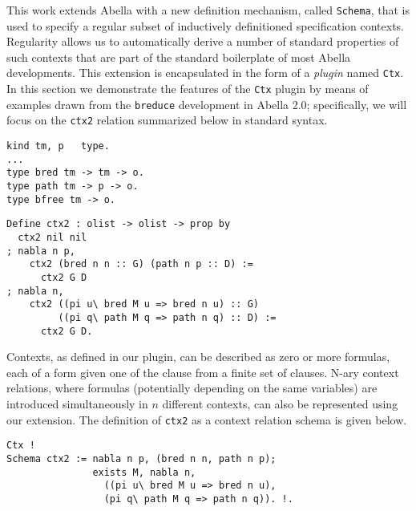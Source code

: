 \documentclass[nocopyrightspace,authoryear]{sigplanconf}
\begin{document}
This work extends Abella with a new definition mechanism, called \lstinline{Schema}, that is used to specify a regular subset of inductively definitioned specification contexts. Regularity allows us to automatically derive a number of standard properties of such contexts that are part of the standard boilerplate of most Abella developments.
%
This extension is encapsulated in the form of a \emph{plugin} named \lstinline{Ctx}.
%
In this section we demonstrate the features of the \lstinline{Ctx} plugin by means of examples drawn from the \lstinline{breduce} development in Abella 2.0; specifically, we will focus on the \lstinline{ctx2} relation summarized below in standard syntax.

\begin{lstlisting}
kind tm, p   type.
...
type bred tm -> tm -> o.
type path tm -> p -> o.
type bfree tm -> o.
\end{lstlisting}
\begin{lstlisting}
Define ctx2 : olist -> olist -> prop by
  ctx2 nil nil
; nabla n p,
    ctx2 (bred n n :: G) (path n p :: D) := 
      ctx2 G D
; nabla n,
    ctx2 ((pi u\ bred M u => bred n u) :: G)
         ((pi q\ path M q => path n q) :: D) :=
      ctx2 G D.
\end{lstlisting}

Contexts, as defined in our plugin, can be described as zero or more formulas, each of a form given one of the clause from a finite set of clauses. N-ary context relations, where formulas (potentially depending on the same variables) are introduced simultaneously in  $n$ different contexts, can also be represented using our extension. The definition of \lstinline|ctx2| as a context relation schema is given below.

\begin{lstlisting}
Ctx !
Schema ctx2 := nabla n p, (bred n n, path n p);
               exists M, nabla n, 
                 ((pi u\ bred M u => bred n u), 
                 (pi q\ path M q => path n q)). !.
\end{lstlisting}


\end{document}
